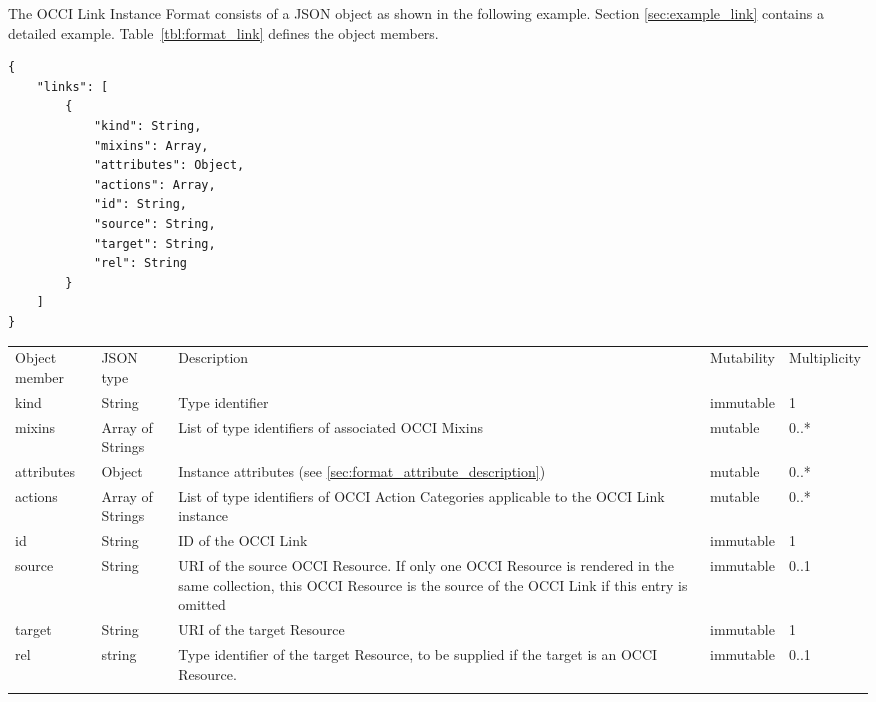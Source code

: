 \documentclass[10pt,a4paper]{article}
\begin{document}
The OCCI Link Instance Format consists of a JSON object as shown in the
following example. Section \ref{sec:example_link} contains a detailed example.
Table~\ref{tbl:format_link} defines the object members.
\begin{lstlisting}
{
    "links": [
        {
            "kind": String,
            "mixins": Array,
            "attributes": Object,
            "actions": Array,
            "id": String,
            "source": String,
            "target": String,
            "rel": String
        }
    ]
}
\end{lstlisting}
 {
    \begin{tabularx}{\textwidth}{llXll}
    \toprule
    Object member & JSON type & Description & Mutability & Multiplicity \\
    \colrule
    kind & String & Type identifier & immutable & 1 \\

    mixins & Array of Strings & List of type identifiers of associated OCCI
Mixins &
    mutable & 0..* \\

    attributes & Object & Instance attributes (see
\ref{sec:format_attribute_description}) & mutable & 0..* \\
    
    actions & Array of Strings & List of type identifiers of OCCI
Action Categories applicable to the OCCI Link instance & mutable & 0..* \\
    
    id & String & ID of the OCCI Link & immutable & 1\\
        
    source & String & URI of the source OCCI Resource. If only one OCCI 
Resource is rendered in the same collection, this OCCI Resource is the 
source of the OCCI Link if this entry is omitted & immutable & 0..1\\
    
    target & String & URI of the target Resource & immutable & 1\\
         
    rel & string & Type identifier of the target Resource, to be supplied if
the target is an OCCI Resource. & immutable & 0..1 \\
    \botrule
    \end{tabularx}
}
\end{document}
